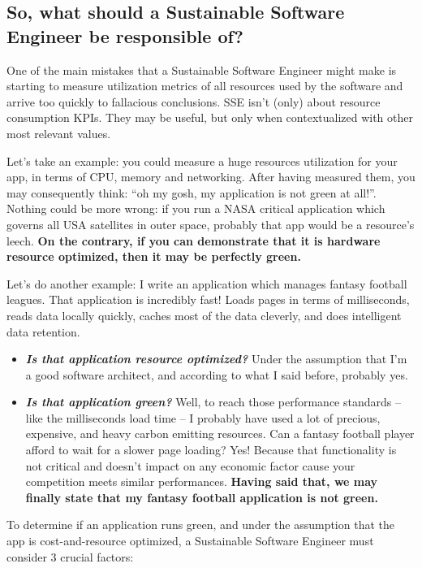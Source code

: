 \documentclass{article}
\begin{document}
\subsection*{So, what should a Sustainable Software Engineer be responsible of?}

One of the main mistakes that a Sustainable Software Engineer might make is starting to measure utilization metrics of all resources used by the software and arrive too quickly to fallacious conclusions. SSE isn’t (only) about resource consumption KPIs. They may be useful, but only when contextualized with other most relevant values.

\vspace{\baselineskip}
Let’s take an example: you could measure a huge resources utilization for your app, in terms of CPU, memory and networking. After having measured them, you may consequently think: “oh my gosh, my application is not green at all!”. Nothing could be more wrong: if you run a NASA critical application which governs all USA satellites in outer space, probably that app would be a resource’s leech. \textbf{On the contrary, if you can demonstrate that it is hardware resource optimized, then it may be perfectly green.}

\vspace{\baselineskip}
Let’s do another example: I write an application which manages fantasy football leagues. That application is incredibly fast! Loads pages in terms of milliseconds, reads data locally quickly, caches most of the data cleverly, and does intelligent data retention.

\begin{itemize}
    \item \textbf{\textit{Is that application resource optimized?}} Under the assumption that I’m a good software architect, and according to what I said before, probably yes.
    \item \textbf{\textit{Is that application green?}} Well, to reach those performance standards – like the milliseconds load time – I probably have used a lot of precious, expensive, and heavy carbon emitting resources. Can a fantasy football player afford to wait for a slower page loading? Yes! Because that functionality is not critical and doesn’t impact on any economic factor cause your competition meets similar performances. \textbf{Having said that, we may finally state that my fantasy football application is not green.}
\end{itemize}

To determine if an application runs green, and under the assumption that the app is cost-and-resource optimized, a Sustainable Software Engineer must consider 3 crucial factors:
\end{document}
